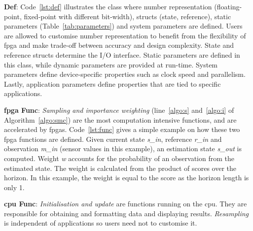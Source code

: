 \textbf{Def}: Code~\ref{lst:def} illustrates the class where number representation (floating-point, fixed-point with different bit-width), structs (state, reference), static parameters (Table~\ref{tab:parameters}) and system parameters are defined.
Users are allowed to customise number representation to benefit from the flexibility of \gls{fpga} and make trade-off between accuracy and design complexity.
State and reference structs determine the I/O interface.
Static parameters are defined in this class, while dynamic parameters are provided at run-time.
System parameters define device-specific properties such as clock speed and parallelism.
Lastly, application parameters define properties that are tied to specific applications.

\textbf{\gls{fpga} Func}: \textit{Sampling and importance weighting} (line~\ref{algo:s} and~\ref{algo:i} of Algorithm~\ref{algo:smc}) are the most computation intensive functions, and are accelerated by \glspl{fpga}.
Code~\ref{lst:func} gives a simple example on how these two \gls{fpga} functions are defined.
Given current state \textit{s\_in}, reference \textit{r\_in} and observation \textit{m\_in} (sensor values in this example), an estimation state \textit{s\_out} is computed.
Weight \textit{w} accounts for the probability of an observation from the estimated state.
The weight is calculated from the product of scores over the horizon.
In this example, the weight is equal to the score as the horizon length is only 1. 

\textbf{\gls{cpu} Func}: \textit{Initialisation and update} are functions running on the \gls{cpu}.
They are responsible for obtaining and formatting data and displaying results.
\textit{Resampling} is independent of applications so users need not to customise it.

